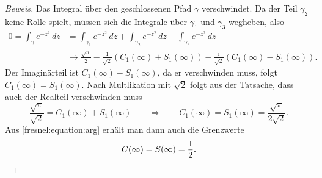 \begin{proof}[Beweis]
Das Integral über den geschlossenen Pfad $\gamma$ verschwindet.
Da der Teil $\gamma_2$ keine Rolle spielt, müssen sich die
Integrale über $\gamma_1$ und $\gamma_3$ wegheben, also
\begin{align*}
0
=
\int_\gamma e^{-z^2}\,dz
&=
\int_{\gamma_1} e^{-z^2}\,dz
+
\int_{\gamma_2} e^{-z^2}\,dz
+
\int_{\gamma_3} e^{-z^2}\,dz
\\
&\to
\frac{\sqrt{\pi}}2
-\frac{1}{\sqrt{2}}(C_1(\infty)+S_1(\infty))
-\frac{i}{\sqrt{2}}(C_1(\infty)-S_1(\infty)).
\end{align*}
Der Imaginärteil ist $C_1(\infty)-S_1(\infty)$, da er verschwinden
muss, folgt $C_1(\infty)=S_1(\infty)$.
Nach Multlikation mit $\sqrt{2}$ folgt aus der Tatsache, dass auch
der Realteil verschwinden muss
\[
\frac{\sqrt{\pi}}{\sqrt{2}} = C_1(\infty)+S_1(\infty)
\qquad
\Rightarrow
\qquad
C_1(\infty)
=
S_1(\infty)
=
\frac{\sqrt{\pi}}{2\sqrt{2}}.
\]
Aus
\eqref{fresnel:equation:arg}
erhält man dann auch die Grenzwerte
\[
C(\infty)=S(\infty)=\frac12.
\qedhere
\]
\end{proof}
